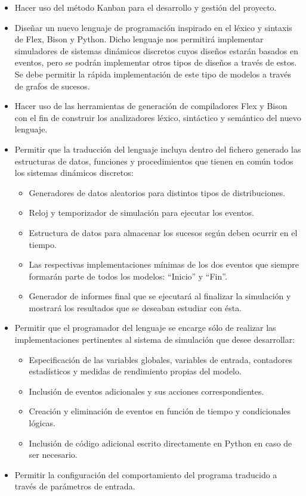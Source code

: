 \begin{itemize}
    \item Hacer uso del método Kanban para el desarrollo y gestión del proyecto.

    \item Diseñar un nuevo lenguaje de programación inspirado en el léxico y
    sintaxis de Flex, Bison y Python. Dicho lenguaje nos permitirá implementar
    simuladores de sistemas dinámicos discretos cuyos diseños estarán basados en
    eventos, pero se podrán implementar otros tipos de diseños a través de
    estos. Se debe permitir la rápida implementación de este tipo de modelos a
    través de grafos de sucesos.

    \item Hacer uso de las herramientas de generación de compiladores Flex y
    Bison con el fin de construir los analizadores léxico, sintáctico y
    semántico del nuevo lenguaje.

    \item Permitir que la traducción del lenguaje incluya dentro del fichero
    generado las estructuras de datos, funciones y procedimientos que tienen en
    común todos los sistemas dinámicos discretos:
    \begin{itemize}
        \item Generadores de datos aleatorios para distintos tipos de
        distribuciones.
        \item Reloj y temporizador de simulación para ejecutar los eventos.
        \item Estructura de datos para almacenar los sucesos según deben ocurrir
        en el tiempo.
        \item Las respectivas implementaciones mínimas de los dos eventos que
        siempre formarán parte de todos los modelos: “Inicio” y “Fin”.
        \item Generador de informes final que se ejecutará al finalizar la
        simulación y mostrará los resultados que se deseaban estudiar con ésta.
    \end{itemize}

    \item Permitir que el programador del lenguaje se encarge sólo de realizar
    las implementaciones pertinentes al sistema de simulación que desee
    desarrollar:
    \begin{itemize}
        \item Especificación de las variables globales, variables de entrada,
        contadores estadísticos y medidas de rendimiento propias del modelo.
        \item Inclusión de eventos adicionales y sus acciones correspondientes.
        \item Creación y eliminación de eventos en función de tiempo y
        condicionales lógicas.
        \item Inclusión de código adicional escrito directamente en Python en
        caso de ser necesario.
    \end{itemize}

    \item Permitir la configuración del comportamiento del programa traducido a
    través de parámetros de entrada.
\end{itemize}